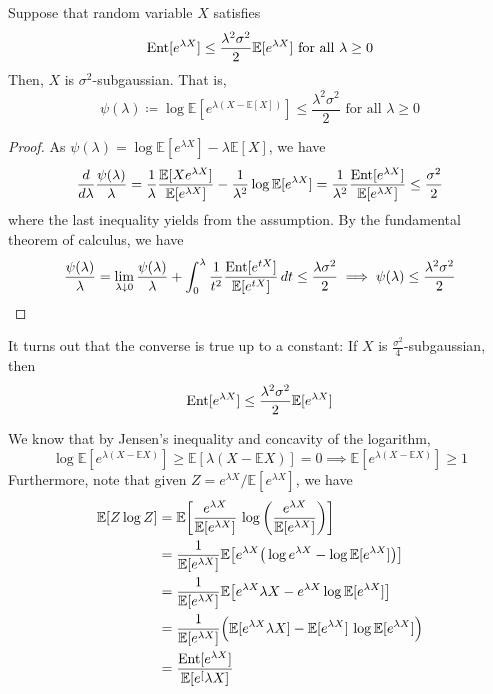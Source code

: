   \begin{lemma}[Herbst]
  Suppose that random variable $X$ satisfies
  \[\Ent[e^{\lambda X}] \leq \frac{\lambda^2 \sigma^2}{2} \mathbb{E}[e^{\lambda X}]  \text{ for all } \lambda \geq 0\]
  Then, $X$ is $\sigma^2$-subgaussian. That is, 
  \[\psi(\lambda) \coloneqq \log\mathbb{E}[e^{\lambda (X - \mathbb{E}[X])}] \leq \frac{\lambda^2 \sigma^2}{2} \text{ for all } \lambda \geq 0\]
  \end{lemma}
  \begin{proof}
  As $\psi(\lambda) = \log\mathbb{E}[ e^{\lambda X}] - \lambda \mathbb{E}[X]$, we have 
  \[\frac{d}{d \lambda} \frac{\psi(\lambda)}{\lambda} = \frac{1}{\lambda} \frac{\mathbb{E}[X e^{\lambda X}]}{\mathbb{E}[e^{\lambda X}]} - \frac{1}{\lambda^2} \log \mathbb{E}[e^{\lambda X}] = \frac{1}{\lambda^2} \frac{\Ent [e^{\lambda X}]}{\mathbb{E}[e^{\lambda X}]} \leq \frac{\sigma^2}{2}\]
  where the last inequality yields from the assumption. By the fundamental theorem of calculus, we have 
  \[\frac{\psi (\lambda)}{\lambda} = \lim_{\lambda \downarrow 0} \frac{\psi(\lambda)}{\lambda} + \int_0^\lambda \frac{1}{t^2} \frac{\Ent[e^{t X}]}{\mathbb{E}[e^{t X}]} \,dt \leq \frac{\lambda \sigma^2}{2} \implies \psi(\lambda) \leq \frac{\lambda^2 \sigma^2}{2}\]
  \end{proof}

  \begin{exercise}
  It turns out that the converse is true up to a constant: If $X$ is $\frac{\sigma^2}{4}$-subgaussian, then 
  \[\Ent [e^{\lambda X}] \leq \frac{\lambda^2 \sigma^2}{2} \mathbb{E}[e^{\lambda X}]\]
  \end{exercise}
  \begin{solution}
  We know that by Jensen's inequality and concavity of the logarithm, 
  \[\log \mathbb{E}[e^{\lambda(X - \mathbb{E} X)}] \geq \mathbb{E}[\lambda (X - \mathbb{E} X)] = 0 \implies \mathbb{E}[e^{\lambda(X - \mathbb{E} X)}] \geq 1\]
  Furthermore, note that given $Z = e^{\lambda X} / \mathbb{E}[e^{\lambda X}]$, we have 
  \begin{align*}
      \mathbb{E}[Z \log{Z}] & = \mathbb{E} \bigg[ \frac{e^{\lambda X}}{\mathbb{E}[e^{\lambda X}]} \, \log \bigg( \frac{e^{\lambda X}}{\mathbb{E}[e^{\lambda X}]} \bigg) \bigg] \\
      & = \frac{1}{\mathbb{E}[e^{\lambda X}]} \mathbb{E}\big[ e^{\lambda X} \big( \log e^{\lambda X} - \log \mathbb{E}[e^{\lambda X}] \big) \big] \\
      & = \frac{1}{\mathbb{E}[e^{\lambda X}]} \mathbb{E} \big[ e^{\lambda X} \lambda X - e^{\lambda X} \log \mathbb{E}[e^{\lambda X}] \big] \\
      & = \frac{1}{\mathbb{E}[e^{\lambda X}]} \Big( \mathbb{E} [ e^{\lambda X} \lambda X ] - \mathbb{E}[ e^{\lambda X}] \, \log \mathbb{E}[e^{\lambda X}] \Big) \\
      & = \frac{\Ent [e^{\lambda X}]}{\mathbb{E}[e^[{\lambda X}]} 
  \end{align*}

  \end{solution}

